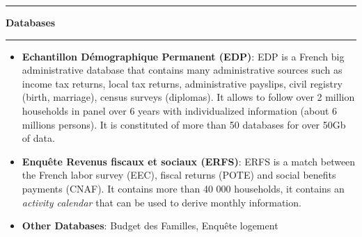 \documentclass[a4paper,11pt]{article} %
\newcommand{\titre}[1]{%
	\begin{center}
	\rule{\textwidth}{1pt}
	\par\vspace{0.1cm}
        \textbf{\large #1}
	\par\rule{\textwidth}{1pt}
	\end{center}
	}
\begin{document}
\titre{Databases}

\begin{itemize}
\item \textbf{Echantillon Démographique Permanent (EDP)}:  EDP is a French big administrative database that contains many administrative sources such as income tax returns, local tax returns, administrative payslips, civil registry (birth, marriage), census surveys (diplomas). It allows to follow over 2 million households in panel over 6 years with individualized information (about 6 millions persons). It is constituted of more than 50 databases for over 50Gb of data.
\item \textbf{Enquête Revenus fiscaux et sociaux (ERFS)}:  ERFS is a match between the French labor survey (EEC), fiscal returns (POTE) and social benefits payments (CNAF). It contains more than 40 000 households, it contains an \emph{activity calendar} that can be used to derive monthly information.

\item \textbf{Other Databases}:  Budget des Familles, Enquête logement
\end{itemize}
\newpage



%
%


\newpage






\newpage
\end{document}
